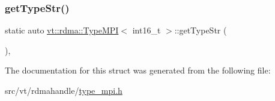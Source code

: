 \mbox{\label{structvt_1_1rdma_1_1_type_m_p_i_3_01int16__t_01_4_a66d15559fecf6e7e6ff76a11a9e3149c}} 
\subsubsection{\texorpdfstring{get\+Type\+Str()}{getTypeStr()}}
{\footnotesize\ttfamily static auto \hyperlink{structvt_1_1rdma_1_1_type_m_p_i}{vt\+::rdma\+::\+Type\+M\+PI}$<$ int16\+\_\+t $>$\+::get\+Type\+Str (\begin{DoxyParamCaption}{ }\end{DoxyParamCaption})\hspace{0.3cm}{\ttfamily [inline]}, {\ttfamily [static]}}



The documentation for this struct was generated from the following file\+:\begin{DoxyCompactItemize}
\item 
src/vt/rdmahandle/\hyperlink{type__mpi_8h}{type\+\_\+mpi.\+h}\end{DoxyCompactItemize}

